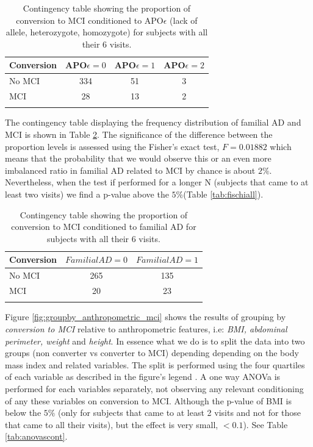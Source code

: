 \documentclass[11pt]{article}
\theoremstyle{definition}
\theoremstyle{remark}
\begin{document}
\begin{table}[ht]
\centering
\caption{Contingency table showing the proportion of conversion to MCI conditioned to APO$\epsilon$ (lack of allele, heterozygote, homozygote) for subjects with all their 6 visits.}
\begin{tabular}[t]{lccc}
\hline
Conversion&APO$\epsilon=0$&APO$\epsilon=1$&APO$\epsilon=2$ \\
\hline
No MCI&334&51&3\\
MCI&28&13&2\\
\hline
\label{tab:apoemci}
\end{tabular}
\end{table}%

The contingency table displaying the frequency distribution of familial AD and MCI is shown in Table \ref{tab:famimci}. The significance of the difference between the proportion levels is assessed using the Fisher's exact test, $F = 0.01882$ which means that the probability that we would observe this or an even more imbalanced ratio in familial AD related to MCI by chance is about $2\%$. Nevertheless, when the test if performed for a longer N (subjects that came to at least two visits) we find a p-value above the $5\%$(Table \ref{tab:fischiall}).

\begin{table}[ht]
\centering
\caption{Contingency table showing the proportion of conversion to MCI conditioned to familial AD for subjects with all their 6 visits.}
\begin{tabular}[t]{lcc}
\hline
Conversion&{$FamilialAD=0$}&{$FamilialAD=1$} \\
\hline
No MCI&265&135\\
MCI&20&23\\
\hline
\label{tab:famimci}
\end{tabular}
\end{table}%

Figure \ref{fig:groupby_anthropometric_mci} shows the results of grouping by \emph{conversion to MCI} relative to anthropometric features, i.e: \emph{BMI, abdominal perimeter, weight} and \emph{height}. In essence what we do is to split the data into two groups (non converter vs converter to MCI) depending depending on the body mass index and related variables. The split is performed using the four quartiles of each variable as described in the figure's legend .
A one way ANOVa is performed for each variables separately, not observing any relevant conditioning of any these variables on conversion to MCI. Although the p-value of BMI is below the $5\%$ (only for subjects that came to at least 2 visits and not for those that came to all their visits), but the effect is very small, $<0.1$). See Table \ref{tab:anovascont}.
\end{document}
